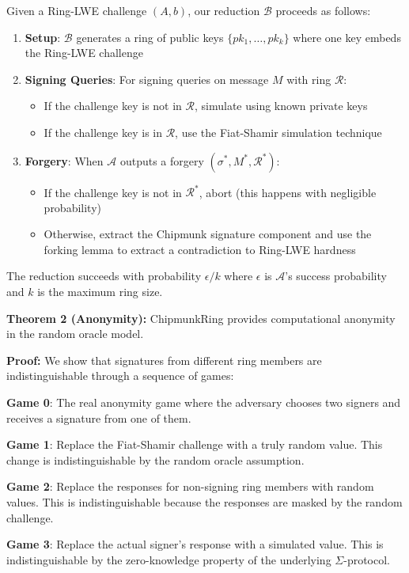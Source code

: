 \documentclass[11pt,a4paper]{article}
\begin{document}
Given a Ring-LWE challenge $(A, b)$, our reduction $\mathcal{B}$ proceeds as follows:
\begin{enumerate}
\item \textbf{Setup}: $\mathcal{B}$ generates a ring of public keys $\{pk_1, \ldots, pk_k\}$ where one key embeds the Ring-LWE challenge
\item \textbf{Signing Queries}: For signing queries on message $M$ with ring $\mathcal{R}$:
   \begin{itemize}
   \item If the challenge key is not in $\mathcal{R}$, simulate using known private keys
   \item If the challenge key is in $\mathcal{R}$, use the Fiat-Shamir simulation technique
   \end{itemize}
\item \textbf{Forgery}: When $\mathcal{A}$ outputs a forgery $(\sigma^*, M^*, \mathcal{R}^*)$:
   \begin{itemize}
   \item If the challenge key is not in $\mathcal{R}^*$, abort (this happens with negligible probability)
   \item Otherwise, extract the Chipmunk signature component and use the forking lemma to extract a contradiction to Ring-LWE hardness
   \end{itemize}
\end{enumerate}

The reduction succeeds with probability $\epsilon/k$ where $\epsilon$ is $\mathcal{A}$'s success probability and $k$ is the maximum ring size.

\textbf{Theorem 2 (Anonymity):} ChipmunkRing provides computational anonymity in the random oracle model.

\textbf{Proof:} We show that signatures from different ring members are indistinguishable through a sequence of games:

\textbf{Game 0}: The real anonymity game where the adversary chooses two signers and receives a signature from one of them.

\textbf{Game 1}: Replace the Fiat-Shamir challenge with a truly random value. This change is indistinguishable by the random oracle assumption.

\textbf{Game 2}: Replace the responses for non-signing ring members with random values. This is indistinguishable because the responses are masked by the random challenge.

\textbf{Game 3}: Replace the actual signer's response with a simulated value. This is indistinguishable by the zero-knowledge property of the underlying $\Sigma$-protocol.
\end{document}
